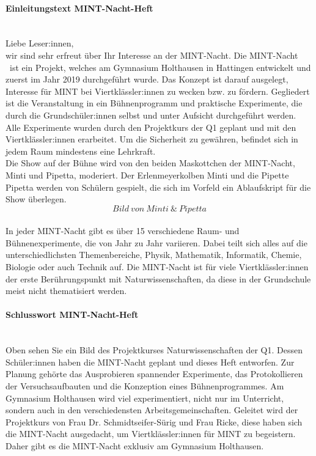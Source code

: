 \documentclass[12pt,a4paper]{report}
\newcommand{\gen}[0]{:innen }
\newcommand{\gens}[0]{:innen}
\newcommand{\mn}[0]{MINT-Nacht }
\newcommand{\mns}[0]{MINT-Nacht}
\begin{document}
	\thispagestyle{empty}
	\noindent
	\large
	\paragraph{Einleitungstext MINT-Nacht-Heft} \mbox{} \\[0.5cm]
	Liebe Leser\gens, \\
	wir sind sehr erfreut über Ihr Interesse an der \mns.
	Die \mn\ ist ein Projekt, welches am Gymnasium Holthausen in Hattingen entwickelt und zuerst im Jahr 2019 durchgeführt wurde.
	Das Konzept ist darauf ausgelegt, Interesse für MINT bei Viertklässler\gen zu wecken bzw. zu fördern.
	Gegliedert ist die Veranstaltung in ein Bühnenprogramm und praktische Experimente, die durch die Grundschüler\gen selbst und unter Aufsicht durchgeführt werden.
	Alle Experimente wurden durch den Projektkurs der Q1 geplant und mit den Viertklässler\gen erarbeitet.
	Um die Sicherheit zu gewähren, befindet sich in jedem Raum mindestens eine Lehrkraft.
	\\
	Die Show auf der Bühne wird von den beiden Maskottchen der \mns, Minti und Pipetta, moderiert.
	Der Erlenmeyerkolben Minti und die Pipette Pipetta werden von Schülern gespielt, die sich im Vorfeld ein Ablaufskript für die Show überlegen.
	\\
	\[Bild\ von \ Minti\ \&\ Pipetta\]
	\\
	In jeder \mn gibt es über 15 verschiedene Raum- und Bühnenexperimente, die von Jahr zu Jahr variieren.
	Dabei teilt sich alles auf die unterschiedlichsten Themenbereiche, Physik, Mathematik, Informatik, Chemie, Biologie oder auch Technik auf.
	Die \mn ist für viele Viertklässler\gen der erste Berührungspunkt mit Naturwissenschaften, da diese in der Grundschule meist nicht thematisiert werden.
	\paragraph{Schlusswort MINT-Nacht-Heft} \mbox{} \\
	Oben sehen Sie ein Bild des Projektkurses Naturwissenschaften der Q1.
	Dessen Schüler\gen haben die MINT-Nacht geplant und dieses Heft entworfen.
	Zur Planung gehörte das Ausprobieren spannender Experimente, das Protokollieren der Versuchsaufbauten und die Konzeption eines Bühnenprogrammes.
	Am Gymnasium Holthausen wird viel experimentiert, nicht nur im Unterricht, sondern auch in den verschiedensten Arbeitsgemeinschaften.
	Geleitet wird der Projektkurs von Frau Dr. Schmidtseifer-Sürig und Frau Ricke, diese haben sich die MINT-Nacht ausgedacht, um Viertklässler\gen für MINT zu begeistern.
	Daher gibt es die MINT-Nacht exklusiv am Gymnasium Holthausen.
\end{document}
